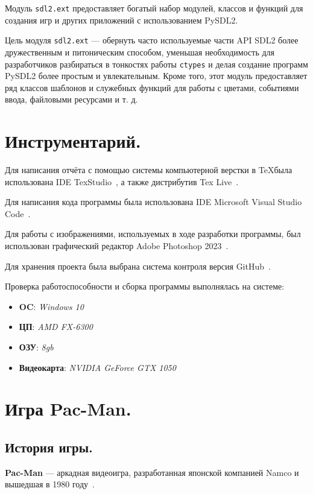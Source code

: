 Модуль \texttt{sdl2.ext} предоставляет богатый набор модулей, классов и функций для создания игр и других приложений с использованием PySDL2.

Цель модуля \texttt{sdl2.ext} --- обернуть часто используемые части API SDL2 более дружественным и питоническим способом, уменьшая необходимость для разработчиков разбираться в тонкостях работы \texttt{ctypes} и делая создание программ PySDL2 более простым и увлекательным.
Кроме того, этот модуль предоставляет ряд классов шаблонов и служебных функций для работы с цветами, событиями ввода, файловыми ресурсами и т. д.


\section{\label{sec:ch01/sec03}Инструментарий.}
Для написания отчёта с помощью системы компьютерной верстки в \TeX была использована IDE TexStudio~\cite{texRUtexstud,texENtexstud}, а также дистрибутив Tex Live~\cite{texRUtexlive}.

Для написания кода программы была использована IDE Microsoft Visual Studio Code~\cite{vscodeEN}.

Для работы с изображениями, используемых в ходе разработки программы, был использован графический редактор Adobe Photoshop 2023~\cite{adobeRU}.

Для хранения проекта была выбрана система контроля версия GitHub~\cite{wikiRUGitHub}.

Проверка работоспособности и сборка программы выполнялась на системе:
	\begin{itemize}
		\item \textbf{OC}: \textit{Windows 10}
		\item \textbf{ЦП}: \textit{AMD FX-6300}
		\item \textbf{ОЗУ}: \textit{8gb}
		\item \textbf{Видеокарта}: \textit{NVIDIA GeForce GTX 1050}
	\end{itemize}
	

\section{\label{sec:ch01/sec04}Игра Pac-Man.}
\subsection{\label{subsec:ch01/sec04/subsec01}История игры.}
\textbf{Pac-Man} --- аркадная видеоигра, разработанная японской компанией Namco и вышедшая в 1980 году~\cite{pacmanRU}.

